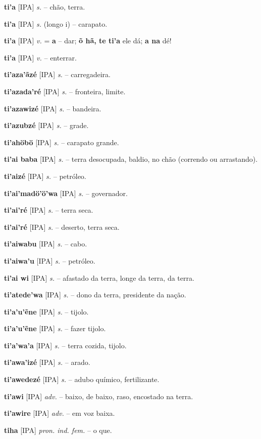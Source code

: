\textbf{ti'a} [IPA] \textit{s.} -- chão, terra.

\textbf{ti'a} [IPA] \textit{s.} (longo i) -- carapato.

\textbf{ti'a} [IPA] \textit{ v.} = \textbf{a} -- dar; \textbf{õ hã, te ti'a} ele dá; \textbf{a na} dé!

\textbf{ti'a} [IPA] \textit{ v.} -- enterrar.

\textbf{ti'aza'ãzé} [IPA] \textit{s.} -- carregadeira.

\textbf{ti'azada'ré} [IPA] \textit{s.} -- fronteira, limite.

\textbf{ti'azawizé} [IPA] \textit{s.} -- bandeira.

\textbf{ti'azubzé} [IPA] \textit{s.} -- grade.

\textbf{ti'ahöbö} [IPA] \textit{s.} -- carapato grande.

\textbf{ti'ai baba} [IPA] \textit{s.} -- terra desocupada, baldio, no chão (correndo ou arrastando).

\textbf{ti'aizé} [IPA] \textit{s.} -- petróleo.

\textbf{ti'ai'madö'ö'wa} [IPA] \textit{s.} -- governador.

\textbf{ti'ai'ré} [IPA] \textit{s.} -- terra seca.

\textbf{ti'ai'ré} [IPA] \textit{s.} -- deserto, terra seca.

\textbf{ti'aiwabu} [IPA] \textit{s.} -- cabo.

\textbf{ti'aiwa'u} [IPA] \textit{s.} -- petróleo.

\textbf{ti'ai wi} [IPA] \textit{s.} -- afastado da terra, longe da terra, da terra.

\textbf{ti'atede'wa} [IPA] \textit{s.} -- dono da terra, presidente da nação.

\textbf{ti'a'u'ẽne} [IPA] \textit{s.} -- tijolo.

\textbf{ti'a'u'ẽne} [IPA] \textit{s.} -- fazer tijolo.

\textbf{ti'a'wa'a} [IPA] \textit{s.} -- terra cozida, tijolo.

\textbf{ti'awa'izé} [IPA] \textit{s.} -- arado.

\textbf{ti'awedezé} [IPA] \textit{s.} -- adubo químico, fertilizante.

\textbf{ti'awi} [IPA] \textit{adv.} -- baixo, de baixo, raso, encostado na terra.

\textbf{ti'awire} [IPA] \textit{adv.} -- em voz baixa.

\textbf{tiha} [IPA] \textit{pron. ind. fem.} -- o que.

